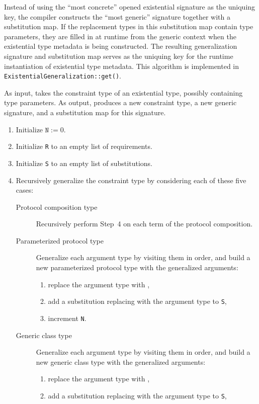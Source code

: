 \documentclass[../generics]{subfiles}
\begin{document}
Instead of using the ``most concrete'' opened existential signature as the uniquing key, the compiler constructs the ``most generic'' signature together with a substitution map. If the replacement types in this substitution map contain type parameters, they are filled in at runtime from the generic context when the existential type metadata is being constructed. The resulting generalization signature and substitution map serves as the uniquing key for the runtime instantiation of existential type metadata. This algorithm is implemented in \texttt{ExistentialGeneralization::get()}.

\begin{algorithm}\label{existentialgeneralizationalgo}
As input, takes the constraint type of an existential type, possibly containing type parameters. As output, produces a new constraint type, a new generic signature, and a substitution map for this signature.
\begin{enumerate}
\item Initialize $\texttt{N}:=0$.
\item Initialize \texttt{R} to an empty list of requirements.
\item Initialize \texttt{S} to an empty list of substitutions.
\item Recursively generalize the constraint type by considering each of these five cases:
\begin{description}
\item [Protocol composition type] Recursively perform Step~4 on each term of the protocol composition.
\item [Parameterized protocol type] Generalize each argument type by visiting them in order, and build a new parameterized protocol type with the generalized arguments:
\begin{enumerate}
\item replace the argument type with ,
\item add a substitution replacing  with the argument type to \texttt{S},
\item increment \texttt{N}.
\end{enumerate}
\item [Generic class type] Generalize each argument type by visiting them in order, and build a new generic class type with the generalized arguments:
\begin{enumerate}
\item replace the argument type with ,
\item add a substitution replacing  with the argument type to \texttt{S},

\end{enumerate}
\end{description}
\end{enumerate}
\end{algorithm}
\end{document}
